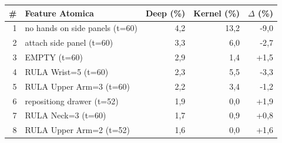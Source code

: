 \begin{tabular*}{\linewidth}{@{}r@{\extracolsep{\fill}}lrrr@{}}
\toprule
\textbf{\#} & \textbf{Feature Atomica} & \textbf{Deep (\%)} & \textbf{Kernel (\%)} & \textbf{$\Delta$ (\%)} \\
\midrule
1 & no hands on side panels (t=60) & 4{,}2 & 13{,}2 & -9{,}0 \\
2 & attach side panel (t=60) & 3{,}3 & 6{,}0 & -2{,}7 \\
3 & EMPTY (t=60) & 2{,}9 & 1{,}4 & +1{,}5 \\
4 & RULA Wrist=5 (t=60) & 2{,}3 & 5{,}5 & -3{,}3 \\
5 & RULA Upper Arm=3 (t=60) & 2{,}2 & 3{,}4 & -1{,}2 \\
6 & repositiong drawer (t=52) & 1{,}9 & 0{,}0 & +1{,}9 \\
7 & RULA Neck=3 (t=60) & 1{,}7 & 0{,}9 & +0{,}8 \\
8 & RULA Upper Arm=2 (t=52) & 1{,}6 & 0{,}0 & +1{,}6 \\
\bottomrule
\end{tabular*}
